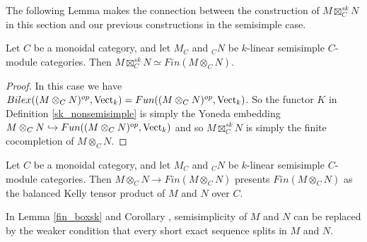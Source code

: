 The following Lemma makes the connection between the construction of $M\boxtimes_C^{sk}N$ in this section and our previous constructions in the semisimple case.

%  
 \begin{lemma}\label{fin_boxsk}
Let $C$ be a monoidal category, and let $M_C$ and $_{C}N$ be $k$-linear semisimple $C$-module categories. Then $M\boxtimes_C^{sk}N\simeq Fin(M\otimes_C N)$.
 \end{lemma}
\begin{proof}
 In this case we have $Bilex((M\otimes_C N)^{op},\operatorname{Vect}_k)=Fun((M\otimes_C N)^{op},\operatorname{Vect}_k)$. So the functor $K$ in Definition \ref{sk_nonsemisimple} is simply the Yoneda embedding $M\otimes_C N\hookrightarrow Fun((M\otimes_C N)^{op},\operatorname{Vect}_k)$ and so $M\boxtimes_C^{sk} N$ is simply the finite cocompletion of $M\otimes_C N$.\end{proof}

\begin{corollary}\label{fin_kelly}
Let $C$ be a monoidal category, and let $M_C$ and $_{C}N$ be $k$-linear semisimple $C$-module categories. Then $M\otimes_CN\to Fin(M\otimes_C N)$ presents $Fin(M\otimes_C N)$ as the balanced Kelly tensor product of $M$ and $N$ over $C$. 
\end{corollary}

\begin{remark}
In Lemma \ref{fin_boxsk} and Corollary \label{fin_kelly}, semisimplicity of $M$ and $N$ can be replaced by the weaker condition that every short exact sequence splits in $M$ and $N$. \end{remark}


